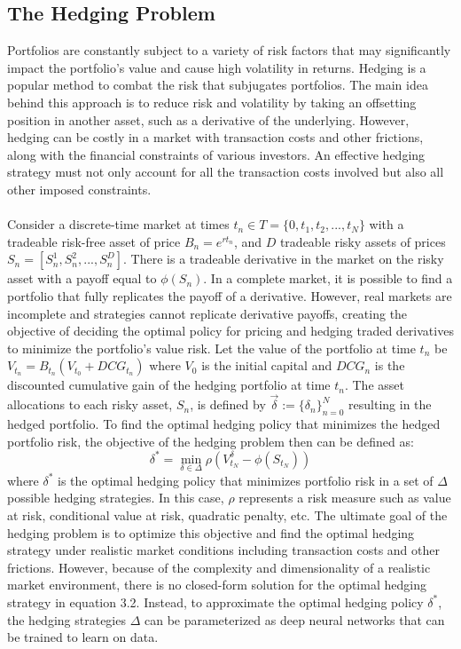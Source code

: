 \subsection{The Hedging Problem}

Portfolios are constantly subject to a variety of risk factors that may significantly impact the portfolio's value and cause high volatility in returns. Hedging is a popular method to combat the risk that subjugates portfolios. The main idea behind this approach is to reduce risk and volatility by taking an offsetting position in another asset, such as a derivative of the underlying. However, hedging can be costly in a market with transaction costs and other frictions, along with the financial constraints of various investors. An effective hedging strategy must not only account for all the transaction costs involved but also all other imposed constraints.
\\ \\
Consider a discrete-time market at times $t_n \in T = \{0, t_1, t_2,..., t_N\}$ with a tradeable risk-free asset of price $B_n = e^{rt_n}$, and $D$ tradeable risky assets of prices $S_n = [S_n^1, S_n^2,..., S_n^D]$. There is a tradeable derivative in the market on the risky asset with a payoff equal to $\phi(S_n)$. In a complete market, it is possible to find a portfolio that fully replicates the payoff of a derivative. However, real markets are incomplete and strategies cannot replicate derivative payoffs, creating the objective of deciding the optimal policy for pricing and hedging traded derivatives to minimize the portfolio's value risk. Let the value of the portfolio at time $t_n$ be $V_{t_n}=B_{t_n}(V_{t_0}+DCG_{t_n})$ where $V_0$ is the initial capital and $DCG_n$ is the discounted cumulative gain of the hedging portfolio at time $t_n$. The asset allocations to each risky asset, $S_n$, is defined by $\vec\delta:=\{\delta_n\}^N_{n=0}$ resulting in the hedged portfolio. To find the optimal hedging policy that minimizes the hedged portfolio risk, the objective of the hedging problem then can be defined as:
\begin{equation}
    \delta^* = \min_{\delta \in \Delta}{\rho(V_{t_N}^\delta-\phi(S_{t_N}))}
\end{equation}
\noindent where $\delta^*$ is the optimal hedging policy that minimizes portfolio risk in a set of $\Delta$ possible hedging strategies. In this case, $\rho$ represents a risk measure such as value at risk, conditional value at risk, quadratic penalty, etc. The ultimate goal of the hedging problem is to optimize this objective and find the optimal hedging strategy under realistic market conditions including transaction costs and other frictions. However, because of the complexity and dimensionality of a realistic market environment, there is no closed-form solution for the optimal hedging strategy in equation 3.2. Instead, to approximate the optimal hedging policy $\delta^*$, the hedging strategies $\Delta$ can be parameterized as deep neural networks that can be trained to learn on data. 
